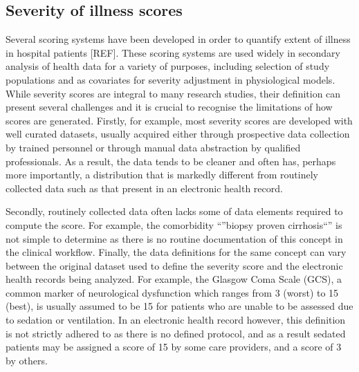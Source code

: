 \documentclass{elsart}
\begin{document}
\subsection{Severity of illness scores}



Several scoring systems have been developed in order to quantify extent of illness in hospital patients [REF]. These scoring systems are used widely in secondary analysis of health data for a variety of purposes, including selection of study populations and as covariates for severity adjustment in physiological models. While severity scores are integral to many research studies, their definition can present several challenges and it is crucial to recognise the limitations of how scores are generated. Firstly, for example, most severity scores are developed with well curated datasets, usually acquired either through prospective data collection by trained personnel or through manual data abstraction by qualified professionals. As a result, the data tends to be cleaner and often has, perhaps more importantly, a distribution that is markedly different from routinely collected data such as that present in an electronic health record. 

Secondly, routinely collected data often lacks some of data elements required to compute the score. For example, the comorbidity ``''biopsy proven cirrhosis``'' is not simple to determine as there is no routine documentation of this concept in the clinical workflow. Finally, the data definitions for the same concept can vary between the original dataset used to define the severity score and the electronic health records being analyzed. For example, the Glasgow Coma Scale (GCS), a common marker of neurological dysfunction which ranges from 3 (worst) to 15 (best), is usually assumed to be 15 for patients who are unable to be assessed due to sedation or ventilation. In an electronic health record however, this definition is not strictly adhered to as there is no defined protocol, and as a result sedated patients may be assigned a score of 15 by some care providers, and a score of 3 by others.
\end{document}

